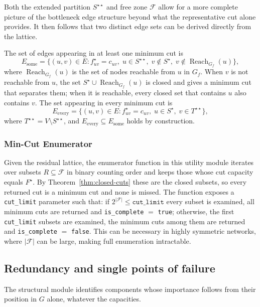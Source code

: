 \documentclass[12pt]{report}
\begin{document}
Both the extended partition $S^{\star\star}$ and free zone $\mathcal{F}$ allow for a more complete picture of the bottleneck edge structure beyond what the representative cut alone provides. It then follows that two distinct edge sets can be derived directly from the lattice.

 The set of edges appearing in at least one minimum cut is \[ E_{\text{some}} = \{(u,v)\in E : f^\star_{uv} = c_{uv},\; u \in S^{\star\star},\; v \notin S^\star,\; v \notin \operatorname{Reach}_{G_f}(u)\}, \] where $\operatorname{Reach}_{G_f}(u)$ is the set of nodes reachable from $u$ in $G_f$. When $v$ is not reachable from $u$, the set $S^\star \cup \operatorname{Reach}_{G_f}(u)$ is closed and gives a minimum cut that separates them; when it is reachable, every closed set that contains $u$ also contains $v$. The set appearing in every minimum cut is \[ E_{\text{every}} = \{(u,v)\in E : f^\star_{uv} = c_{uv},\; u \in S^\star,\; v \in T^{\star\star}\}, \] where $T^{\star\star} = V \setminus S^{\star\star}$, and $E_{\text{every}} \subseteq E_{\text{some}}$ holds by construction.

\subsubsection{Min-Cut Enumerator}
Given the residual lattice, the enumerator function in this utility module iterates over subsets $R \subseteq \mathcal{F}$ in binary counting order and keeps those whose cut capacity equals $F^\star$. By Theorem~\ref{thm:closed-cuts} these are the closed subsets, so every returned cut is a minimum cut and none is missed. The function exposes a \texttt{cut\_limit} parameter such that: if $2^{|\mathcal{F}|} \leq \texttt{cut\_limit}$ every subset is examined, all minimum cuts are returned and \texttt{is\_complete} $=$ \texttt{true}; otherwise, the first \texttt{cut\_limit} subsets are examined, the minimum cuts among them are returned and \texttt{is\_complete} $=$ \texttt{false}. This can be necessary in highly symmetric networks, where $|\mathcal{F}|$ can be large, making full enumeration intractable.



\subsection{Redundancy and single points of failure}
\label{sec:flow-structure}
The structural module identifies components whose importance follows from their position in $G$ alone, whatever the capacities. 
\end{document}
